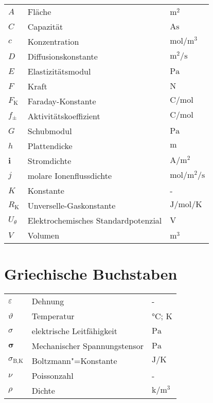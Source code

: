 {\begin{longtable}{@{}p{\TabulatorVZ}@{}p{\TabulatorTX}p{\TabulatorEH}@{}}
	$A$					& Fläche					& $\si{\metre\squared}$ \\
	$C$					& Capazität					& $\si{\ampere\s}$					\\
	$c$					& Konzentration				& $\si{\mole\per\metre\cubed}$\\
	$D$					& Diffusionskonstante		& $\si{\metre\squared\per\second}$\\
	$E$					& Elastizitätsmodul			& $\si{\pascal}$	\\
	$F$					& Kraft						& $\si{\newton}$	\\
	$F_{\text{K}}$		& Faraday-Konstante			& $\si{\coulomb\per\mole}$	\\
	$f_{\pm}$			& Aktivitätskoeffizient		& $\si{\coulomb\per\mole}$	\\
	$G$					& Schubmodul				& $\si{\pascal}$	\\
	$h$					& Plattendicke				& $\si{\metre}$		\\
	$\textbf{i}$		& Stromdichte				& $\si{\ampere\per\metre\squared}$		\\
	$j$					& molare Ionenflussdichte	& $\si{\mole\per\metre\squared\per\second}$		\\
	$K$					& Konstante					& -					\\
	$R_{\text{K}}$		& Unverselle-Gaskonstante	& $\si{\joule\per\mole\per\kelvin}$	\\
	$U_{\theta}$ 		& Elektrochemisches Standardpotenzial	& $\si{\volt}$ \\
	$V$					& Volumen					& $\si{\cubic\metre}$
\end{longtable}

\section*{Griechische Buchstaben}
\begin{longtable}{@{}p{\TabulatorVZ}@{}p{\TabulatorTX}p{\TabulatorEH}@{}}
	$\varepsilon$			& Dehnung						& -	\\
	$\vartheta$				& Temperatur					& $\si{\celsius}$; $\si{\kelvin}$ \\
	$\sigma$				& elektrische Leitfähigkeit		& $\si{\pascal}$ \\
	$\boldsymbol{\sigma}$	& Mechanischer Spannungstensor	& $\si{\pascal}$ \\
	$\sigma_{\text{B,K}}$	& Boltzmann"=Konstante 			& $\si{\joule\per\kelvin}$ \\
	$\nu$					& Poissonzahl					& -	\\
	$\rho$					& Dichte						& $\si{\kilo\per\metre\cubed}$
\end{longtable}

}
